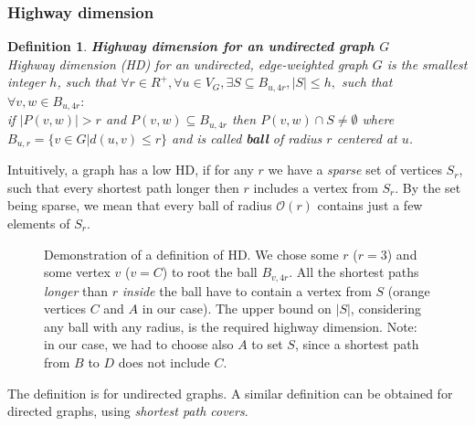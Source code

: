 \documentclass[a4paper]{article}
\newcommand{\inputTikZ}[1]{%
  }
\newcommand{\inputTikZ}[1]{%
    \beginpgfgraphicnamed{#1-external}%
    \endpgfgraphicnamed%
  }
\newtheorem{definition}{Definition}
\begin{document}
            \subsubsection{Highway dimension}
            \begin{definition}
                \textbf{Highway dimension for an undirected graph $G$} ~\cite{highwaydim10} \\
                Highway dimension (HD) for an undirected, edge-weighted graph $G$ is the smallest integer $h$, such that
                \vskip 10pt
                \indent $\forall r \in R^{+}, \forall u \in V_{G}, \exists S \subseteq B_{u, 4r}, |S| \leq h,$ such that $\forall v, w \in B_{u, 4r}:$ \\
                \indent \indent if $|P(v, w)| > r$ and $P(v, w) \subseteq B_{u, 4r}$ then $P(v, w) \cap S \neq \emptyset$
                \vskip 10pt
                \noindent where $B_{u, r} = \{v \in G | d(u, v) \leq r\}$ and is called \textbf{ball} of radius $r$ centered at $u$.
            \end{definition}

            \noindent Intuitively, a graph has a low HD, if for any $r$ we have a \emph{sparse} set of vertices $S_{r}$, such that every shortest path longer then $r$ includes a vertex from $S_{r}$. By the set being sparse, we mean that every ball of radius $\mathcal{O}(r)$ contains just a few elements of $S_{r}$.

            \begin{figure}[h!]
                \begin{center}
                    \inputTikZ{./tikzpics/highwaydim}
                \end{center}
                \caption{\label{fig:highdemonstr} Demonstration of a definition of HD. We chose some $r$ ($r = 3$) and some vertex $v$ ($v = C$) to root the ball $B_{v, 4r}$. All the shortest paths \emph{longer} than $r$ \emph{inside} the ball have to contain a vertex from $S$ (orange vertices $C$ and $A$ in our case). The upper bound on $|S|$, considering any ball with any radius, is the required highway dimension. Note: in our case, we had to choose also $A$ to set $S$, since a shortest path from $B$ to $D$ does not include $C$.}
            \end{figure}

            The definition is for undirected graphs. A similar definition can be obtained for directed graphs, using \emph{shortest path covers}. %
\end{document}
